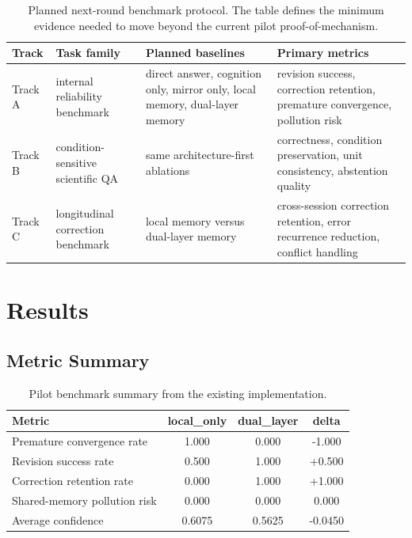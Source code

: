 \documentclass[12pt]{article}
\begin{document}
\begin{table}[H]
\centering
\begin{tabular}{p{2.2cm}p{3.6cm}p{3.5cm}p{3.6cm}}
\toprule
Track & Task family & Planned baselines & Primary metrics \\
\midrule
Track A & internal reliability benchmark & direct answer, cognition only, mirror only, local memory, dual-layer memory & revision success, correction retention, premature convergence, pollution risk \\
Track B & condition-sensitive scientific QA & same architecture-first ablations & correctness, condition preservation, unit consistency, abstention quality \\
Track C & longitudinal correction benchmark & local memory versus dual-layer memory & cross-session correction retention, error recurrence reduction, conflict handling \\
\bottomrule
\end{tabular}
\caption{Planned next-round benchmark protocol. The table defines the minimum evidence needed to move beyond the current pilot proof-of-mechanism.}
\label{tab:planned-benchmark}
\end{table}

\section{Results}

\subsection{Metric Summary}

\begin{table}[H]
\centering
\begin{tabular}{lccc}
\toprule
Metric & local\_only & dual\_layer & delta \\
\midrule
Premature convergence rate & 1.000 & 0.000 & -1.000 \\
Revision success rate & 0.500 & 1.000 & +0.500 \\
Correction retention rate & 0.000 & 1.000 & +1.000 \\
Shared-memory pollution risk & 0.000 & 0.000 & 0.000 \\
Average confidence & 0.6075 & 0.5625 & -0.0450 \\
\bottomrule
\end{tabular}
\caption{Pilot benchmark summary from the existing implementation.}
\label{tab:current-results}
\end{table}
\end{document}
